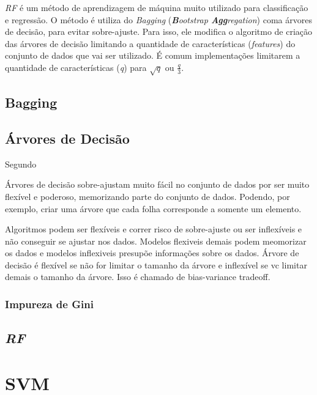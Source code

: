
\textit{\acrshort{RF}} é um método de aprendizagem de máquina muito utilizado para classificação e regressão. O método é utiliza do \textit{Bagging} (\textit{\textbf{B}ootstrap \textbf{Agg}regation}) coma árvores de decisão, para evitar sobre-ajuste. Para isso, ele modifica o algoritmo de criação das árvores de decisão limitando a quantidade de características (\textit{features}) do conjunto de dados que vai ser utilizado. É comum implementações limitarem a quantidade de características (\textit{q}) para $ \sqrt{q} $ ou $ \frac{q}{3} $.

\subsection{Bagging}



\subsection{Árvores de Decisão}

Segundo \citet{}

 Árvores de decisão sobre-ajustam muito fácil no conjunto de dados por ser muito flexível e poderoso, memorizando parte do conjunto de dados. Podendo, por exemplo, criar uma árvore que cada folha corresponde a somente um elemento.

 Algoritmos podem ser flexíveis e correr risco de sobre-ajuste ou ser inflexíveis e não conseguir se ajustar nos dados. Modelos flexiveis demais podem  meomorizar os dados e modelos inflexiveis presupõe informações sobre os dados.
 Árvore de decisão é flexível se não for limitar o tamanho da árvore e inflexível se vc limitar demais o tamanho da árvore. Isso é chamado de bias-variance tradeoff.

\subsubsection{Impureza de Gini}

\subsection{\textit{\acrshort{RF}}}


\section{\acrfull{SVM}}


